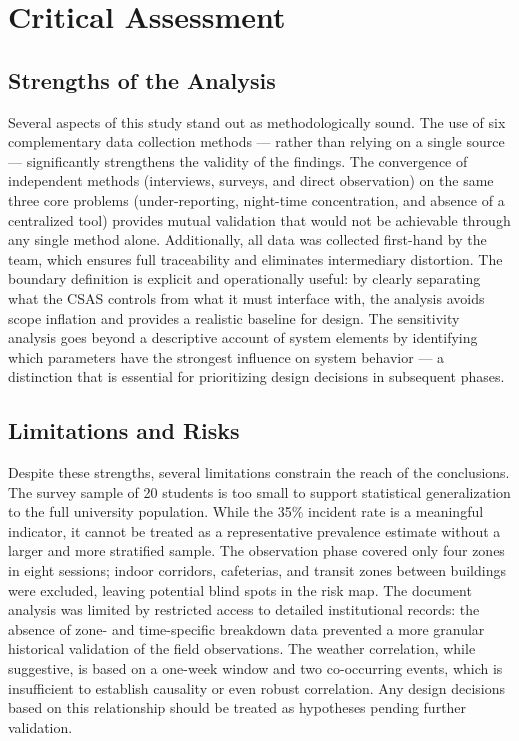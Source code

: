 \documentclass[12pt, onecolumn]{IEEEtran}
\begin{document}
\section{Critical Assessment}

\subsection{Strengths of the Analysis}

Several aspects of this study stand out as methodologically sound.
The use of six complementary data collection methods --- rather than
relying on a single source --- significantly strengthens the validity
of the findings. The convergence of independent methods (interviews,
surveys, and direct observation) on the same three core problems
(under-reporting, night-time concentration, and absence of a centralized
tool) provides mutual validation that would not be achievable through
any single method alone. Additionally, all data was collected
first-hand by the team, which ensures full traceability and eliminates
intermediary distortion. The boundary definition is explicit and
operationally useful: by clearly separating what the CSAS controls
from what it must interface with, the analysis avoids scope inflation
and provides a realistic baseline for design. The sensitivity analysis
goes beyond a descriptive account of system elements by identifying
which parameters have the strongest influence on system behavior ---
a distinction that is essential for prioritizing design decisions in
subsequent phases.

\subsection{Limitations and Risks}

Despite these strengths, several limitations constrain the reach of
the conclusions. The survey sample of 20 students is too small to
support statistical generalization to the full university population.
While the 35\% incident rate is a meaningful indicator, it cannot be
treated as a representative prevalence estimate without a larger and
more stratified sample. The observation phase covered only four zones
in eight sessions; indoor corridors, cafeterias, and transit zones
between buildings were excluded, leaving potential blind spots in the
risk map. The document analysis was limited by restricted access to
detailed institutional records: the absence of zone- and time-specific
breakdown data prevented a more granular historical validation of the
field observations. The weather correlation, while suggestive, is based
on a one-week window and two co-occurring events, which is insufficient
to establish causality or even robust correlation. Any design decisions
based on this relationship should be treated as hypotheses pending
further validation.
\end{document}
